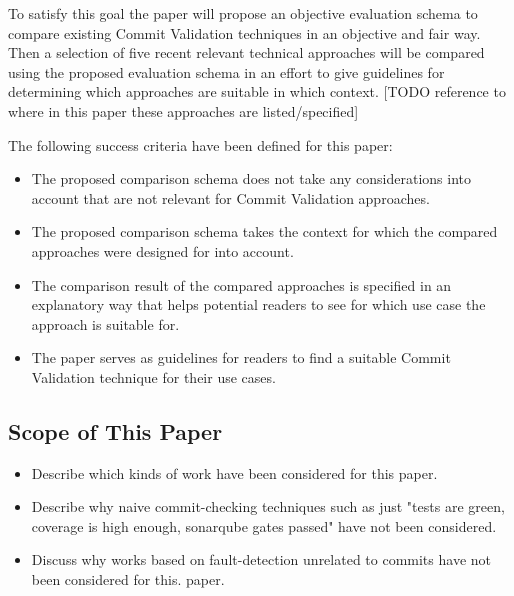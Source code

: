 To satisfy this goal the paper will propose an objective evaluation schema to compare existing Commit Validation techniques in an objective and fair way. Then a selection of five recent relevant technical approaches will be compared using the proposed evaluation schema in an effort to give guidelines for determining which approaches are suitable in which context. [TODO reference to where in this paper these approaches are listed/specified]

The following success criteria have been defined for this paper: 

\begin{itemize}
	\item The proposed comparison schema does not take any considerations into account that are not relevant for Commit Validation approaches.
	\item The proposed comparison schema takes the context for which the compared approaches were designed for into account.
	\item The comparison result of the compared approaches is specified in an explanatory way that helps potential readers to see for which use case the approach is suitable for.
	\item The paper serves as guidelines for readers to find a suitable Commit Validation technique for their use cases.
\end{itemize}



\subsection{Scope of This Paper}
\label{sec:scope}
\begin{itemize}
	\item Describe which kinds of work have been considered for this paper.
	\item Describe why naive commit-checking techniques such as just "tests are green, coverage is high enough, sonarqube gates passed" have not been considered.
	\item Discuss why works based on fault-detection unrelated to commits have not been considered for this. paper.
\end{itemize}

